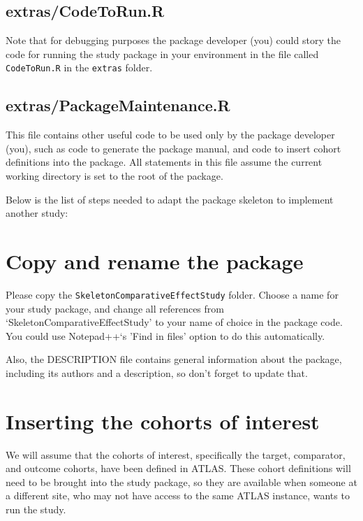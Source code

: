 \documentclass[
]{article}
\begin{document}
\hypertarget{extrascodetorun.r}{%
\subsection{extras/CodeToRun.R}\label{extrascodetorun.r}}

Note that for debugging purposes the package developer (you) could story
the code for running the study package in your environment in the file
called \texttt{CodeToRun.R} in the \texttt{extras} folder.

\hypertarget{extraspackagemaintenance.r}{%
\subsection{extras/PackageMaintenance.R}\label{extraspackagemaintenance.r}}

This file contains other useful code to be used only by the package
developer (you), such as code to generate the package manual, and code
to insert cohort definitions into the package. All statements in this
file assume the current working directory is set to the root of the
package.

Below is the list of steps needed to adapt the package skeleton to
implement another study:

\hypertarget{copy-and-rename-the-package}{%
\section{Copy and rename the
package}\label{copy-and-rename-the-package}}

Please copy the \texttt{SkeletonComparativeEffectStudy} folder. Choose a
name for your study package, and change all references from
`SkeletonComparativeEffectStudy' to your name of choice in the package
code. You could use Notepad++`s 'Find in files' option to do this
automatically.

Also, the DESCRIPTION file contains general information about the
package, including its authors and a description, so don't forget to
update that.

\hypertarget{inserting-the-cohorts-of-interest}{%
\section{Inserting the cohorts of
interest}\label{inserting-the-cohorts-of-interest}}

We will assume that the cohorts of interest, specifically the target,
comparator, and outcome cohorts, have been defined in ATLAS. These
cohort definitions will need to be brought into the study package, so
they are available when someone at a different site, who may not have
access to the same ATLAS instance, wants to run the study.
\end{document}
